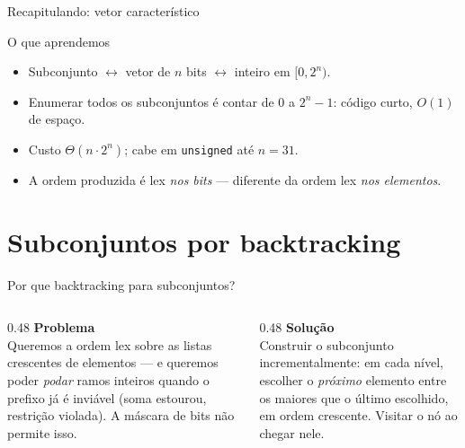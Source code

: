 \documentclass[aspectratio=169]{beamer}
\begin{document}
\begin{frame}{Recapitulando: vetor característico}
  \begin{block}{O que aprendemos}
    \begin{itemize}
      \item Subconjunto $\leftrightarrow$ vetor de $n$ bits $\leftrightarrow$ inteiro em $[0, 2^n)$.
      \item Enumerar todos os subconjuntos é contar de $0$ a $2^n-1$: código curto, $O(1)$ de espaço.
      \item Custo $\Theta(n \cdot 2^n)$; cabe em \texttt{unsigned} até $n = 31$.
      \item A ordem produzida é lex \emph{nos bits} --- diferente da ordem lex \emph{nos elementos}.
    \end{itemize}
  \end{block}
\end{frame}

\section{Subconjuntos por backtracking}

\begin{frame}{Por que backtracking para subconjuntos?}
  \begin{columns}[T]
    \begin{column}{0.48\textwidth}
      \textbf{Problema}\\[2pt]
      Queremos a ordem lex sobre as listas crescentes de elementos --- e
      queremos poder \emph{podar} ramos inteiros quando o prefixo já é inviável
      (soma estourou, restrição violada). A máscara de bits não permite isso.
    \end{column}
    \begin{column}{0.48\textwidth}
      \textbf{Solução}\\[2pt]
      Construir o subconjunto incrementalmente: em cada nível, escolher o
      \emph{próximo} elemento entre os maiores que o último escolhido, em ordem
      crescente. Visitar o nó ao chegar nele.
    \end{column}
  \end{columns}
\end{frame}
\end{document}
